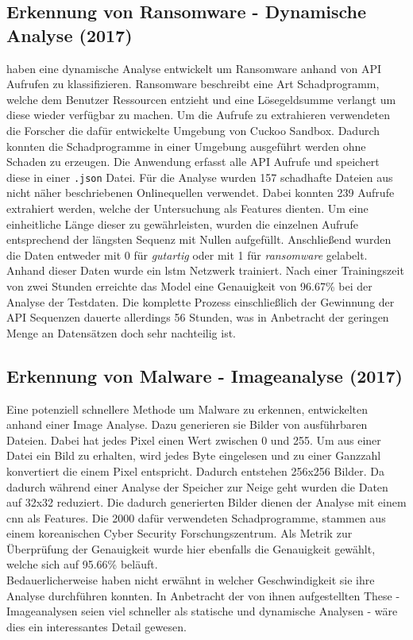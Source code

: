 \documentclass[
    12pt, %
    DIV10,
    ngerman, %
    a4paper, %
    oneside, %
    titlepage, %
    parskip=half, %
    headings=normal, %
    listof=totoc, %
    bibliography=totoc, %
    index=totoc, %
    captions=tableheading, %
    final %
]{scrreprt}
\begin{document}
\subsection{Erkennung von Ransomware - Dynamische Analyse (2017)}
\textcite{Maniath2018} haben eine dynamische Analyse entwickelt um Ransomware anhand von API Aufrufen zu klassifizieren. Ransomware beschreibt eine Art Schadprogramm, welche dem Benutzer Ressourcen entzieht und eine Lösegeldsumme verlangt um diese wieder verfügbar zu machen. Um die Aufrufe zu extrahieren verwendeten die Forscher die dafür entwickelte Umgebung von Cuckoo Sandbox. Dadurch konnten die Schadprogramme in einer Umgebung ausgeführt werden ohne Schaden zu erzeugen. Die Anwendung erfasst alle API Aufrufe und speichert diese in einer \texttt{.json} Datei. Für die Analyse wurden 157 schadhafte Dateien aus nicht näher beschriebenen Onlinequellen verwendet. Dabei konnten 239 Aufrufe extrahiert werden, welche der Untersuchung als Features dienten. Um eine einheitliche Länge dieser zu gewährleisten, wurden die einzelnen Aufrufe entsprechend der längsten Sequenz mit Nullen aufgefüllt. Anschließend wurden die Daten entweder mit 0 für \emph{gutartig} oder mit 1 für \emph{ransomware} gelabelt. Anhand dieser Daten wurde ein \ac{lstm} Netzwerk trainiert. Nach einer Trainingszeit von zwei Stunden erreichte das Model eine Genauigkeit von 96.67\% bei der Analyse der Testdaten. Die komplette Prozess einschließlich der Gewinnung der API Sequenzen dauerte allerdings 56 Stunden, was in Anbetracht der geringen Menge an Datensätzen doch sehr nachteilig ist.
%
\subsection{Erkennung von Malware - Imageanalyse (2017)}
Eine potenziell schnellere Methode um Malware zu erkennen, entwickelten \textcite{8190895} anhand einer Image Analyse. Dazu generieren sie Bilder von ausführbaren Dateien. Dabei hat jedes Pixel einen Wert zwischen 0 und 255. Um aus einer Datei ein Bild zu erhalten, wird jedes Byte eingelesen und zu einer Ganzzahl konvertiert die einem Pixel entspricht. Dadurch entstehen 256x256 Bilder. Da dadurch während einer Analyse der Speicher zur Neige geht wurden die Daten auf 32x32 reduziert. Die dadurch generierten Bilder dienen der Analyse mit einem \ac{cnn} als Features. Die 2000 dafür verwendeten Schadprogramme, stammen aus einem koreanischen Cyber Security Forschungszentrum. Als Metrik zur Überprüfung der Genauigkeit wurde hier ebenfalls die Genauigkeit gewählt, welche sich auf 95.66\% beläuft.\\
Bedauerlicherweise haben \textcite{8190895} nicht erwähnt in welcher Geschwindigkeit sie ihre Analyse durchführen konnten. In Anbetracht der von ihnen aufgestellten These - Imageanalysen seien viel schneller als statische und dynamische Analysen - wäre dies ein interessantes Detail gewesen.
\end{document}
